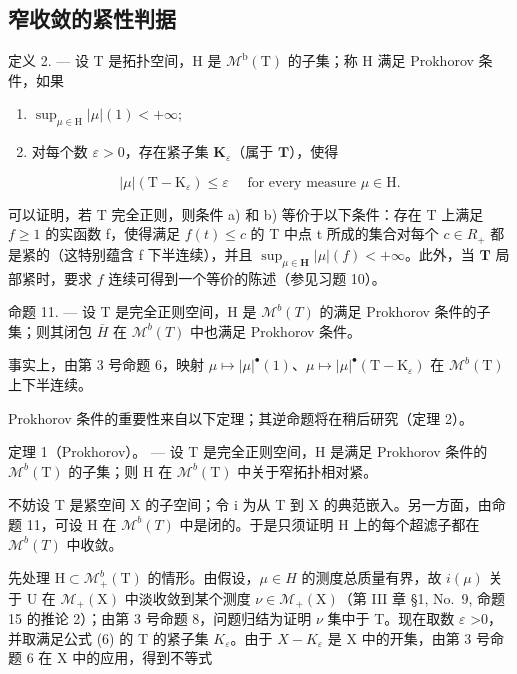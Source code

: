 \subsection{窄收敛的紧性判据}

定义 2. --- 设 T 是拓扑空间，H 是 \(\mathcal{M}^{\mathrm{b}}(\mathrm{T})\) 的子集；称 H 满足 Prokhorov 条件，如果

\begin{enumerate}
\def\labelenumi{\alph{enumi})}
\item
  \(\sup_{\mu \in \mathrm{H}}|\mu |(1) < +\infty ;\)
\item
  对每个数 \(\varepsilon > 0\)，存在紧子集 \(\mathbf{K}_{\varepsilon}\)（属于 \(\mathbf{T}\)），使得
\end{enumerate}

\[
| \mu | (\mathrm{T} - \mathrm{K} _ {\varepsilon}) \leqslant \varepsilon \quad \text { for every measure } \mu \in \mathrm{H}.\tag{6}
\]

可以证明，若 T 完全正则，则条件 a) 和 b) 等价于以下条件：存在 T 上满足 \(f \geqslant 1\) 的实函数 f，使得满足 \(f(t) \leqslant c\) 的 T 中点 t 所成的集合对每个 \(c \in R_{+}\) 都是紧的（这特别蕴含 f 下半连续），并且 \(\sup_{\mu \in \mathbf{H}} |\mu|(f) < +\infty\)。此外，当 \(\mathbf{T}\) 局部紧时，要求 \(f\) 连续可得到一个等价的陈述（参见习题 10）。

命题 11. --- 设 T 是完全正则空间，H 是 \(\mathcal{M}^{b}(T)\) 的满足 Prokhorov 条件的子集；则其闭包 \(\overline{H}\) 在 \(\mathcal{M}^{b}(T)\) 中也满足 Prokhorov 条件。

事实上，由第 3 号命题 6，映射 \(\mu \mapsto |\mu|^{\bullet}(1)\)、\(\mu \mapsto |\mu|^{\bullet}(\mathrm{T} - \mathrm{K}_{\varepsilon})\) 在 \(\mathcal{M}^b (\mathrm{T})\) 上下半连续。

Prokhorov 条件的重要性来自以下定理；其逆命题将在稍后研究（定理 2）。

定理 1（Prokhorov）。 --- 设 T 是完全正则空间，H 是满足 Prokhorov 条件的 \(\mathcal{M}^{b}(\mathrm{T})\) 的子集；则 H 在 \(\mathcal{M}^{b}(\mathrm{T})\) 中关于窄拓扑相对紧。

不妨设 T 是紧空间 X 的子空间；令 i 为从 T 到 X 的典范嵌入。另一方面，由命题 11，可设 H 在 \(\mathcal{M}^{b}(T)\) 中是闭的。于是只须证明 H 上的每个超滤子都在 \(\mathcal{M}^{b}(T)\) 中收敛。

先处理 \(\mathrm{H}\subset\mathcal{M}_{+}^{b}(\mathrm{T})\) 的情形。由假设，\(\mu\in H\) 的测度总质量有界，故 \(i(\mu)\) 关于 U 在 \(\mathcal{M}_{+}(\mathrm{X})\) 中淡收敛到某个测度 \(\nu\in\mathcal{M}_{+}(\mathrm{X})\)（第 III 章 §1, No.~9, 命题 15 的推论 2）；由第 3 号命题 8，问题归结为证明 \(\nu\) 集中于 T。现在取数 \(\varepsilon\) \textgreater0，并取满足公式 (6) 的 T 的紧子集 \(K_{\varepsilon}\)。由于 \(X-K_{\varepsilon}\) 是 X 中的开集，由第 3 号命题 6 在 X 中的应用，得到不等式

